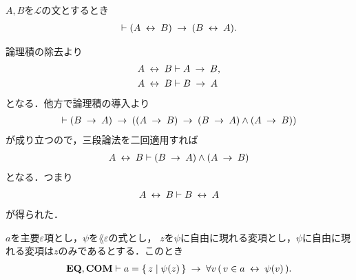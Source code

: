 	\begin{screen}
		\begin{logicalthm}[同値記号の対称律]
		\label{logicalthm:symmetry_of_equivalence_arrows}
			$A,B$を$\mathcal{L}$の文とするとき
			\begin{align}
				\vdash (A \lrarrow B) \rarrow (B \lrarrow A).
			\end{align}
		\end{logicalthm}
	\end{screen}
	
	\begin{prf}
		論理積の除去より
		\begin{align}
			A \lrarrow B &\vdash A \rarrow B, \\
			A \lrarrow B &\vdash B \rarrow A
		\end{align}
		となる．他方で論理積の導入より
		\begin{align}
			\vdash (B \rarrow A) \rarrow ((A \rarrow B) \rarrow 
			(B \rarrow A) \wedge (A \rarrow B))
		\end{align}
		が成り立つので，三段論法を二回適用すれば
		\begin{align}
			A \lrarrow B \vdash (B \rarrow A) \wedge (A \rarrow B)
		\end{align}
		となる．つまり
		\begin{align}
			A \lrarrow B \vdash B \lrarrow A
		\end{align}
		が得られた．
		\QED
	\end{prf}
	
	\begin{screen}
		\begin{thm}
		\label{thm:equivalent_formula_rewriting_1}
			$a$を主要$\varepsilon$項とし，$\psi$を$\lang{\varepsilon}$の式とし，
			$z$を$\psi$に自由に現れる変項とし，$\psi$に自由に現れる変項は$z$のみであるとする．このとき
			\begin{align}
				\EQAX,\COMAX \vdash a = \Set{z}{\psi(z)} 
				\rarrow \forall v\, (\, v \in a \lrarrow \psi(v)\, ).
			\end{align}
		\end{thm}
	\end{screen}
	
